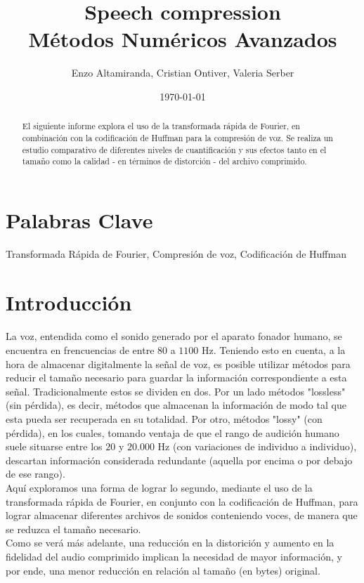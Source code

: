 \documentclass[a4paper,11pt]{article}
\title{Speech compression \\
M\'etodos Num\'ericos Avanzados}
\author{Enzo Altamiranda, Cristian Ontiver, Valeria Serber}
\date{\today}
\begin{document}
\maketitle
\thispagestyle{empty}
\vspace{3cm}

\renewcommand{\abstractname}{Resumen}
\begin{abstract}
El siguiente informe explora el uso de la transformada rápida de Fourier, en
combinación con la codificación de Huffman para la compresión de voz. Se
realiza un estudio comparativo de diferentes niveles de cuantificación y sus
efectos tanto en el tamaño como la calidad - en términos de distorción - del
archivo comprimido.
\end{abstract}
\newpage
\section{Palabras Clave}
Transformada Rápida de Fourier, Compresión de voz, Codificación de Huffman
\newpage
\section{Introducci\'on}
\begin{comment}
[Introduce el tema contextualizando la informacion. Puede incluirse un parrafo
con una breve descripcion historica, otro parrafo motivando el tema. El ultimo
parrafo de esta seccion tiene que ser la descripcion de la estructura del
artıculo, explicitando en que seccion se trata cada tema.]
\end{comment}
\paragraph{}
La voz, entendida como el sonido generado por el aparato fonador humano, se
encuentra en frencuencias de entre $80$ a $1100$ Hz.  Teniendo esto en cuenta,
a la hora de almacenar digitalmente la señal de voz, es posible utilizar
métodos para reducir el tamaño necesario para guardar la información
correspondiente a esta señal.  Tradicionalmente estos se dividen en dos. Por un
lado métodos "lossless" (sin pérdida), es decir, métodos que almacenan la
información de modo tal que esta pueda ser recuperada en su totalidad. Por
otro, métodos "lossy" (con pérdida), en los cuales, tomando ventaja de que el
rango de audición humano suele situarse entre los $20$ y $20.000$ Hz (con
variaciones de individuo a individuo), descartan información considerada
redundante (aquella por encima o por debajo de ese rango).\\
Aquí exploramos una forma de lograr lo segundo, mediante el uso de la
transformada rápida de Fourier, en conjunto con la codificación de Huffman,
para lograr almacenar diferentes archivos de sonidos conteniendo voces, de
manera que se reduzca el tamaño necesario.\\
Como se verá más adelante, una reducción en la distorición y aumento en la
fidelidad del audio comprimido implican la necesidad de mayor información, y
por ende, una menor reducción en relación al tamaño (en bytes) original.
\end{document}
